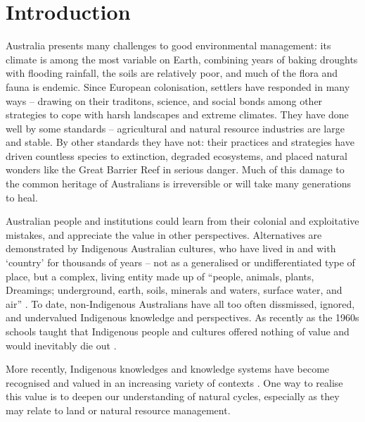 \chapter{Introduction}
\label{ch:introduction}

Australia presents many challenges to good environmental management: its
climate is among the most variable on Earth, combining years of baking
droughts with flooding rainfall, the soils are relatively poor, and much of
the flora and fauna is endemic.
%
Since European colonisation, settlers have responded in many ways --
drawing on their traditons, science, and social bonds among other strategies to cope
with harsh landscapes and extreme climates.
%
They have done well by some standards -- agricultural and natural
resource industries are large and stable.  By other standards they have not:
their practices and strategies have driven countless species to extinction,
degraded ecosystems, and placed natural wonders like the Great Barrier Reef
in serious danger.  Much of this damage to the common heritage of Australians
is irreversible or will take many generations to heal.

Australian people and institutions could learn from their colonial and exploitative mistakes,
and appreciate the value in other perspectives.  Alternatives are demonstrated
by Indigenous Australian cultures, who have lived in and with `country' for
thousands of years -- not as a generalised or undifferentiated
type of place, but a complex, living entity made up of ``people, animals,
plants, Dreamings; underground, earth, soils, minerals and waters, surface
water, and air'' \citep[][p7]{birdrose1996}.
%
To date, non-Indigenous Australians
have all too often dissmissed, ignored, and undervalued Indigenous knowledge
and perspectives.  As recently as the 1960s schools taught that Indigenous
people and cultures offered nothing of value and would inevitably die out
\citep{flannery1994}.


More recently, Indigenous knowledges and knowledge systems have become recognised and valued in an
increasing variety of contexts \citep[eg.][]{petheram2010,cochran2015,
berkes2012}.  One way to realise this value is to deepen our understanding
of natural cycles, especially as they may relate to land or natural resource
management.


